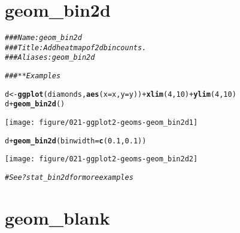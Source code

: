 \documentclass[a4paper,titlepage]{tufte-handout}\usepackage[]{graphicx}\usepackage[]{color}
\makeatletter
\def\maxwidth{ %
  \ifdim\Gin@nat@width>\linewidth
    \linewidth
  \else
    \Gin@nat@width
  \fi
}
\newcommand{\hlnum}[1]{\textcolor[rgb]{0.686,0.059,0.569}{#1}}%
\newcommand{\hlcom}[1]{\textcolor[rgb]{0.678,0.584,0.686}{\textit{#1}}}%
\newcommand{\hlopt}[1]{\textcolor[rgb]{0,0,0}{#1}}%
\newcommand{\hlstd}[1]{\textcolor[rgb]{0.345,0.345,0.345}{#1}}%
\newcommand{\hlkwb}[1]{\textcolor[rgb]{0.69,0.353,0.396}{#1}}%
\newcommand{\hlkwc}[1]{\textcolor[rgb]{0.333,0.667,0.333}{#1}}%
\newcommand{\hlkwd}[1]{\textcolor[rgb]{0.737,0.353,0.396}{\textbf{#1}}}%
\newenvironment{kframe}{%
 \def\at@end@of@kframe{}%
 \ifinner\ifhmode%
  \def\at@end@of@kframe{\end{minipage}}%
  \begin{minipage}{\columnwidth}%
 \fi\fi%
 \def\FrameCommand##1{\hskip\@totalleftmargin \hskip-\fboxsep
 \colorbox{shadecolor}{##1}\hskip-\fboxsep
     \hskip-\linewidth \hskip-\@totalleftmargin \hskip\columnwidth}%
 \MakeFramed {\advance\hsize-\width
   \@totalleftmargin\z@ \linewidth\hsize
   \@setminipage}}%
 {\par\unskip\endMakeFramed%
 \at@end@of@kframe}
\newenvironment{knitrout}{}{} %
\makeatother
\begin{document}
\section{geom\_bin2d}

\begin{knitrout}
\color{fgcolor}\begin{kframe}
\begin{alltt}
\hlcom{### Name: geom_bin2d}
\hlcom{### Title: Add heatmap of 2d bin counts.}
\hlcom{### Aliases: geom_bin2d}

\hlcom{### ** Examples}

\hlstd{d} \hlkwb{<-} \hlkwd{ggplot}\hlstd{(diamonds,} \hlkwd{aes}\hlstd{(}\hlkwc{x} \hlstd{= x,} \hlkwc{y} \hlstd{= y))} \hlopt{+} \hlkwd{xlim}\hlstd{(}\hlnum{4}\hlstd{,}\hlnum{10}\hlstd{)} \hlopt{+} \hlkwd{ylim}\hlstd{(}\hlnum{4}\hlstd{,}\hlnum{10}\hlstd{)}
\hlstd{d} \hlopt{+} \hlkwd{geom_bin2d}\hlstd{()}
\end{alltt}
\end{kframe}
\texttt{[image: figure/021-ggplot2-geoms-geom\_bin2d1]} 
\begin{kframe}\begin{alltt}
\hlstd{d} \hlopt{+} \hlkwd{geom_bin2d}\hlstd{(}\hlkwc{binwidth} \hlstd{=} \hlkwd{c}\hlstd{(}\hlnum{0.1}\hlstd{,} \hlnum{0.1}\hlstd{))}
\end{alltt}
\end{kframe}
\texttt{[image: figure/021-ggplot2-geoms-geom\_bin2d2]} 
\begin{kframe}\begin{alltt}
\hlcom{# See ?stat_bin2d for more examples}
\end{alltt}
\end{kframe}
\end{knitrout}



\section{geom\_blank}
\end{document}
